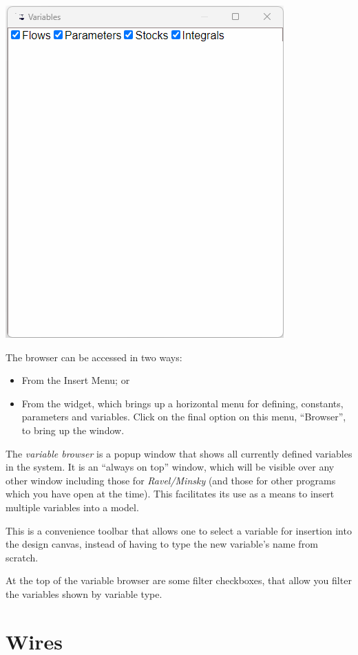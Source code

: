 \label{VariableBrowser}

\includegraphics{images/browserWindow}

The browser can be accessed in two ways:
\begin{itemize}
\item From the Insert Menu; or 
\item From the  widget, which brings up a horizontal
menu for defining, constants, parameters and variables. Click on the
final option on this menu, ``Browser'', to bring up the window. 
\end{itemize}
The \emph{variable browser} is a popup window that shows all currently
defined variables in the system. It is an ``always on top'' window,
which will be visible over any other window including those for \emph{Ravel/Minsky}
(and those for other programs which you have open at the time). This
facilitates its use as a means to insert multiple variables into a
model.

This is a convenience toolbar that allows one to select a variable
for insertion into the design canvas, instead of having to type the
new variable's name from scratch.

At the top of the variable browser are some filter checkboxes, that
allow you filter the variables shown by variable type.

\section{Wires}


